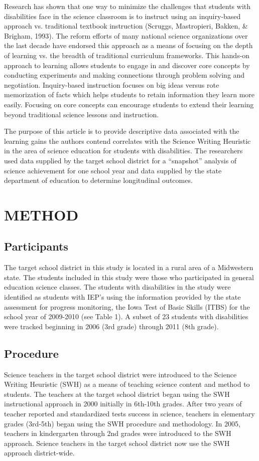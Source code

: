 \documentclass[11.5pt]{sig-alternate} %
\begin{document}
\begin{large}
Research has shown that one way to minimize the challenges that students with disabilities face in the science classroom is to instruct using an inquiry-based approach vs. traditional textbook instruction (Scruggs, Mastropieri, Bakken, \& Brigham, 1993). The reform efforts of many national science organizations over the last decade have endorsed this approach as a means of focusing on the depth of learning vs. the breadth of traditional curriculum frameworks. This hands-on approach to learning allows students to engage in and discover core concepts by conducting experiments and making connections through problem solving and negotiation. Inquiry-based instruction focuses on big ideas versus rote memorization of facts which helps students to retain information they learn more easily. Focusing on core concepts can encourage students to extend their learning beyond traditional science lessons and instruction.

The purpose of this article is to provide descriptive data associated with the learning gains the authors contend correlates with the Science Writing Heuristic in the area of science education for students with disabilities. The researchers used data supplied by the target school district for a “snapshot” analysis of science achievement for one school year and data supplied by the state department of education to determine longitudinal outcomes.

\section*{METHOD}
\subsection*{Participants}
The target school district in this study is located in a rural area of a Midwestern state. The students included in this study were those who participated in general education science classes. The students with disabilities in the study were identified as students with IEP’s using the information provided by the state assessment for progress monitoring, the Iowa Test of Basic Skills (ITBS) for the school year of 2009-2010 (see Table 1). A subset of 23 students with disabilities were tracked beginning in 2006 (3rd grade) through 2011 (8th grade). \\

\subsection*{Procedure}
Science teachers in the target school district were introduced to the Science Writing Heuristic (SWH) as a means of teaching science content and method to students. The teachers at the target school district began using the SWH instructional approach in 2000 initially in 6th-10th grades. After two years of teacher reported and standardized tests success in science, teachers in elementary grades (3rd-5th) began using the SWH procedure and methodology. In 2005, teachers in kindergarten through 2nd grades were introduced to the SWH approach. Science teachers in the target school district now use the SWH approach district-wide.


\end{large}
\end{document}

